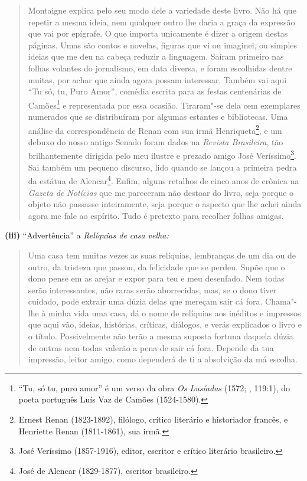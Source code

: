 \begin{quote}
Montaigne explica pelo seu modo dele a variedade deste livro. Não há que
repetir a mesma ideia, nem qualquer outro lhe daria a graça da expressão
que vai por epígrafe. O que importa unicamente é dizer a origem destas
páginas. Umas são contos e novelas, figuras que vi ou imaginei, ou
simples ideias que me deu na cabeça reduzir a linguagem. Saíram primeiro
nas folhas volantes do jornalismo, em data diversa, e foram escolhidas
dentre muitas, por achar que ainda agora possam interessar. Também vai
aqui ``Tu só, tu, Puro Amor'', comédia escrita para as festas
centenárias de Camões\footnote{``Tu, só tu, puro amor'' é um verso da
  obra \emph{Os Lusíadas} (1572; , 119:1), do poeta português Luís
  Vaz de Camões (1524-1580).} e representada por essa ocasião.
Tiraram"-se dela cem exemplares numerados que se distribuíram por algumas
estantes e bibliotecas. Uma análise da correspondência de Renan com sua
irmã Henriqueta\footnote{Ernest Renan (1823-1892), filólogo, crítico
  literário e historiador francês, e Henriette Renan (1811-1861), sua
  irmã.}, e um debuxo do nosso antigo Senado foram dados na
\emph{Revista Brasileira}, tão brilhantemente dirigida pelo meu ilustre
e prezado amigo José Veríssimo\footnote{José Veríssimo (1857-1916),
  editor, escritor e crítico literário brasileiro.}. Sai também um
pequeno discurso, lido quando se lançou a primeira pedra da estátua de
Alencar\footnote{José de Alencar (1829-1877), escritor brasileiro.}.
Enfim, alguns retalhos de cinco anos de crônica na \emph{Gazeta de
Notícias} que me pareceram não destoar do livro, seja porque o objeto
não passasse inteiramente, seja porque o aspecto que lhe achei ainda
agora me fale ao espírito. Tudo é pretexto para recolher folhas amigas.
\end{quote}

\bigskip

\textbf{(iii)} ``Advertência'' a \emph{Relíquias de casa velha: }

\begin{quote}
Uma casa tem muitas vezes as suas relíquias, lembranças de um dia ou de
outro, da tristeza que passou, da felicidade que se perdeu. Supõe que o
dono pense em as arejar e expor para teu e meu desenfado. Nem todas
serão interessantes, não raras serão aborrecidas, mas, se o dono tiver
cuidado, pode extrair uma dúzia delas que mereçam sair cá fora.
Chama"-lhe à minha vida uma casa, dá o nome de relíquias aos inéditos e
impressos que aqui vão, ideias, histórias, críticas, diálogos, e verás
explicados o livro e o título. Possivelmente não terão a mesma suposta
fortuna daquela dúzia de outras nem todas valerão a pena de sair cá
fora. Depende da tua impressão, leitor amigo, como dependerá de ti a
absolvição da má escolha.
\end{quote}